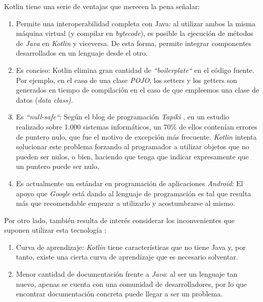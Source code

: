 \documentclass[twoside]{report}
\begin{document}
Kotlin tiene una serie de ventajas que merecen la pena señalar\cite{kotlin}:
\begin{enumerate}

\item Permite una interoperabilidad completa con Java: al utilizar ambos la misma máquina virtual (y compilar en \textit{bytecode}), es posible la ejecución de métodos de \textit{Java} en \textit{Kotlin} y viceversa. De esta forma, permite integrar componentes desarrollados en un lenguaje desde el otro.

\item Es conciso: Kotlin elimina gran cantidad de \textit{“boilerplate“} en el código fuente. Por ejemplo, en el caso de una clase \textit{POJO}, los setters y los getters son generados en tiempo de compilación en el caso de que empleemos una clase de datos (\textit{data class)}.

\item Es \textit{“null-safe“}: Según el blog de programación \textit{Tapiki} \cite{tapikinull}, en un estudio realizado sobre 1.000 sistemas informáticos, un 70\% de ellos contenían errores de puntero nulo, que fue el motivo de excepción más frecuente. \textit{Kotlin} intenta solucionar este problema forzando al programador a utilizar objetos que no pueden ser nulos, o bien, haciendo que tenga que indicar expresamente que un puntero puede ser nulo.

\item Es actualmente un estándar en programación de aplicaciones \textit{Android}: El apoyo que \textit{Google} está dando al lenguaje de programación es tal que resulta más que recomendable empezar a utilizarlo y acostumbrarse al mismo.
\end{enumerate}

Por otro lado, también resulta de interés considerar los inconvenientes que suponen utilizar esta tecnología \cite{disadvKotlin}:
\begin{enumerate}

\item Curva de aprendizaje: \textit{Kotlin} tiene características que no tiene Java y, por tanto, existe una cierta curva de aprendizaje que es necesario solventar.

\item Menor cantidad de documentación frente a \textit{Java}: al ser un lenguaje tan nuevo, apenas se cuenta con una comunidad de desarrolladores, por lo que encontrar documentación concreta puede llegar a ser un problema.
\end{enumerate}
\end{document}
